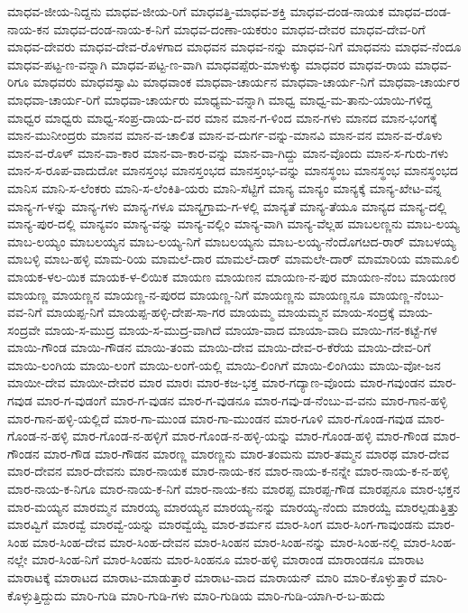 ಮಾಧವ-ಜೀಯ-ನಿದ್ದನು
ಮಾಧವ-ಜೀಯ-ರಿಗೆ
ಮಾಧವತ್ತಿ-ಮಾಧವ-ಶಕ್ತಿ
ಮಾಧವ-ದಂಡ-ನಾಯಕ
ಮಾಧವ-ದಂಡ-ನಾಯ-ಕನ
ಮಾಧವ-ದಂಡ-ನಾಯ-ಕ-ನಿಗೆ
ಮಾಧವ-ದಂಣಾ-ಯಕರುಂ
ಮಾಧವ-ದೇವರ
ಮಾಧವ-ದೇವ-ರಿಗೆ
ಮಾಧವ-ದೇವರು
ಮಾಧವ-ದೇವ-ರೊಳಗಾದ
ಮಾಧವನ
ಮಾಧವ-ನನ್ನು
ಮಾಧವ-ನಿಗೆ
ಮಾಧವನು
ಮಾಧವ-ನೆಂದೂ
ಮಾಧವ-ಪಟ್ಟ-ಣ-ವನ್ನಾಗಿ
ಮಾಧವ-ಪಟ್ಟ-ಣ-ವಾಗಿ
ಮಾಧವಪ್ಪೆರು-ಮಾಳುಕ್ಕು
ಮಾಧವರ
ಮಾಧವ-ರಾಯ
ಮಾಧವ-ರಿಗೂ
ಮಾಧವರು
ಮಾಧವಸ್ವಾಮಿ
ಮಾಧವಾಂಕ
ಮಾಧವಾ-ಚಾರ್ಯನ
ಮಾಧವಾ-ಚಾರ್ಯ-ನಿಗೆ
ಮಾಧವಾ-ಚಾರ್ಯರ
ಮಾಧವಾ-ಚಾರ್ಯ-ರಿಗೆ
ಮಾಧವಾ-ಚಾರ್ಯರು
ಮಾಧ್ಯಮ-ವನ್ನಾಗಿ
ಮಾಧ್ವ
ಮಾಧ್ವ-ಮ-ತಾನು-ಯಾಯಿ-ಗಳಿದ್ದ
ಮಾಧ್ವರ
ಮಾಧ್ವರು
ಮಾಧ್ವ-ಸಂಪ್ರ-ದಾಯ-ದ-ವರ
ಮಾನ
ಮಾನ-ಗ-ಳಿಂದ
ಮಾನ-ಗಳು
ಮಾನದ
ಮಾನ-ಭಂಗಕ್ಕೆ
ಮಾನ-ಮುನೀಂದ್ರರು
ಮಾನವ
ಮಾನ-ವ-ಚಾಲಿತ
ಮಾನ-ವ-ದುರ್ಗ-ವನ್ನು-ಮಾನವಿ
ಮಾನ-ವನ
ಮಾನ-ವ-ರೊಳು
ಮಾನ-ವ-ರೊಳ್
ಮಾನ-ವಾ-ಕಾರ
ಮಾನ-ವಾ-ಕಾರ-ವನ್ನು
ಮಾನ-ವಾ-ಗಿದ್ದು
ಮಾನ-ವೊಂದು
ಮಾನ-ಸ-ಗುರು-ಗಳು
ಮಾನ-ಸ-ರೂಪ-ವಾದುದೋ
ಮಾನಸ್ತಂಭ
ಮಾನಸ್ತಂಭದ
ಮಾನಸ್ತಂಭ-ವನ್ನು
ಮಾನಸ್ಥಂಬ
ಮಾನಸ್ಥಂಭ
ಮಾನಸ್ಥಂಭದ
ಮಾನಿಸ
ಮಾನಿ-ಸ-ಲೆಂಕರು
ಮಾನಿ-ಸ-ಲೆಂಕಿತಿ-ಯರು
ಮಾನಿ-ಸೆಟ್ಟಿಗೆ
ಮಾನ್ಯ
ಮಾನ್ಯಂ
ಮಾನ್ಯಕ್ಕೆ
ಮಾನ್ಯ-ಖೇಟ-ವನ್ನ
ಮಾನ್ಯ-ಗ-ಳನ್ನು
ಮಾನ್ಯ-ಗಳು
ಮಾನ್ಯ-ಗಳೂ
ಮಾನ್ಯಗ್ರಾಮ-ಗ-ಳಲ್ಲಿ
ಮಾನ್ಯತೆ
ಮಾನ್ಯ-ತೆಯೂ
ಮಾನ್ಯದ
ಮಾನ್ಯ-ದಲ್ಲಿ
ಮಾನ್ಯ-ಪುರ-ದಲ್ಲಿ
ಮಾನ್ಯವಂ
ಮಾನ್ಯ-ವನ್ನು
ಮಾನ್ಯ-ವಲ್ಲಿಂ
ಮಾನ್ಯ-ವಾಗಿ
ಮಾನ್ಯ-ವೆಲ್ಲಹ
ಮಾಬಲಣ್ಣನು
ಮಾಬ-ಲಯ್ಯ
ಮಾಬ-ಲಯ್ಯಂ
ಮಾಬಲಯ್ಯನ
ಮಾಬ-ಲಯ್ಯ-ನಿಗೆ
ಮಾಬಲಯ್ಯನು
ಮಾಬ-ಲಯ್ಯ-ನೆಂದೊಗೞದ-ರಾರ್
ಮಾಬಳಯ್ಯ
ಮಾಬಳ್ಳಿ
ಮಾಬ-ಹಳ್ಳಿ
ಮಾಮ-ರಿಯ
ಮಾಮಲೆ-ದಾರ
ಮಾಮಲೆ-ದಾರ್
ಮಾಮಲೇ-ದಾರ್
ಮಾಮಾರಿಯ
ಮಾಮೂಲಿ
ಮಾಯಕ-ಳಲ-ಯಿಕ
ಮಾಯಕ-ಳ-ಲಿಯಿಕ
ಮಾಯಣ
ಮಾಯಣನ
ಮಾಯಣ-ನ-ಪುರ
ಮಾಯಣ-ನೆಂಬ
ಮಾಯಣರ
ಮಾಯಣ್ಣ
ಮಾಯಣ್ಣನ
ಮಾಯಣ್ಣ-ನ-ಪುರದ
ಮಾಯಣ್ಣ-ನಿಗೆ
ಮಾಯಣ್ಣನು
ಮಾಯಣ್ಣನೂ
ಮಾಯಣ್ಣ-ನೆಂಬು-ವವ-ನಿಗೆ
ಮಾಯಪ್ಪ-ನಿಗೆ
ಮಾಯಪ್ಪ-ಹಳ್ಳಿ-ದೇಪ-ಸಾ-ಗರ
ಮಾಯಮ್ಮ
ಮಾಯಮ್ಮನ
ಮಾಯ-ಸಂದ್ರಕ್ಕೆ
ಮಾಯ-ಸಂದ್ರವೇ
ಮಾಯ-ಸ-ಮುದ್ರ
ಮಾಯ-ಸ-ಮುದ್ರ-ವಾಗಿದೆ
ಮಾಯಾ-ವಾದ
ಮಾಯಾ-ವಾದಿ
ಮಾಯಿ-ಗನ-ಕಟ್ಟೆ-ಗಳ
ಮಾಯಿ-ಗೌಂಡ
ಮಾಯಿ-ಗೌಡನ
ಮಾಯಿ-ತಂಮ
ಮಾಯಿ-ದೇವ
ಮಾಯಿ-ದೇವ-ರ-ಕೆರೆಯ
ಮಾಯಿ-ದೇವ-ರಿಗೆ
ಮಾಯಿ-ಲಂಗಿಯ
ಮಾಯಿ-ಲಂಗೆ
ಮಾಯಿ-ಲಂಗೆ-ಯಲ್ಲಿ
ಮಾಯಿ-ಲಿಂಗಿಗೆ
ಮಾಯಿ-ಲಿಂಗಿಯು
ಮಾಯಿ-ವೋ-ಜನ
ಮಾಯೀ-ದೇವ
ಮಾಯೀ-ದೇವರ
ಮಾರ
ಮಾರಃ
ಮಾರ-ಕಜ-ಭಕ್ತ
ಮಾರ-ಗದ್ಯಾಣ-ವೊಂದು
ಮಾರ-ಗವುಂಡನ
ಮಾರ-ಗವುಡ
ಮಾರ-ಗ-ವುಡಂಗೆ
ಮಾರ-ಗ-ವುಡನ
ಮಾರ-ಗ-ವುಡನೂ
ಮಾರ-ಗವು-ಡ-ನೆಂಬು-ವ-ವನು
ಮಾರ-ಗಾನ-ಹಳ್ಳಿ
ಮಾರ-ಗಾನ-ಹಳ್ಳಿ-ಯಲ್ಲಿದೆ
ಮಾರ-ಗಾ-ಮುಂಡ
ಮಾರ-ಗಾ-ಮುಂಡನ
ಮಾರ-ಗೂಳಿ
ಮಾರ-ಗೊಂಡ-ಗವುಡ
ಮಾರ-ಗೊಂಡ-ನ-ಹಳ್ಳಿ
ಮಾರ-ಗೊಂಡ-ನ-ಹಳ್ಳಿಗೆ
ಮಾರ-ಗೊಂಡ-ನ-ಹಳ್ಳಿ-ಯನ್ನು
ಮಾರ-ಗೊಂಡ-ಹಳ್ಳಿ
ಮಾರ-ಗೌಂಡ
ಮಾರ-ಗೌಂಡನ
ಮಾರ-ಗೌಡ
ಮಾರ-ಗೌಡನ
ಮಾರಣ್ಣ
ಮಾರಣ್ಣನು
ಮಾರ-ತಂಮನು
ಮಾರ-ತಮ್ಮನ
ಮಾರಥ
ಮಾರ-ದೇವ
ಮಾರ-ದೇವನ
ಮಾರ-ದೇವನು
ಮಾರ-ನಾಯಕ
ಮಾರ-ನಾಯ-ಕನ
ಮಾರ-ನಾಯ-ಕ-ನನ್ನೇ
ಮಾರ-ನಾಯ-ಕ-ನ-ಹಳ್ಳಿ
ಮಾರ-ನಾಯ-ಕ-ನಿಗೂ
ಮಾರ-ನಾಯ-ಕ-ನಿಗೆ
ಮಾರ-ನಾಯ-ಕನು
ಮಾರಪ್ಪ
ಮಾರಪ್ಪ-ಗೌಡ
ಮಾರಪ್ಪನೂ
ಮಾರ-ಭಕ್ತನ
ಮಾರ-ಮಯ್ಯನ
ಮಾರಮ್ಮನ
ಮಾರಯ್ಯ
ಮಾರಯ್ಯನ
ಮಾರಯ್ಯ-ನನ್ನು
ಮಾರಯ್ಯ-ನೆಂದು
ಮಾರಯ್ವೆ
ಮಾರಲ್ಪಡುತ್ತಿತ್ತು
ಮಾರವ್ವಿಗೆ
ಮಾರವ್ವೆ
ಮಾರವ್ವೆ-ಯನ್ನು
ಮಾರವ್ವೆಯ್ವೆ
ಮಾರ-ಶರ್ಮನ
ಮಾರ-ಸಿಂಗ
ಮಾರ-ಸಿಂಗ-ಗಾವುಂಡನು
ಮಾರ-ಸಿಂಹ
ಮಾರ-ಸಿಂಹ-ದೇವ
ಮಾರ-ಸಿಂಹ-ದೇವನ
ಮಾರ-ಸಿಂಹನ
ಮಾರ-ಸಿಂಹ-ನನ್ನು
ಮಾರ-ಸಿಂಹ-ನಲ್ಲಿ
ಮಾರ-ಸಿಂಹ-ನಲ್ಲೇ
ಮಾರ-ಸಿಂಹ-ನಿಗೆ
ಮಾರ-ಸಿಂಹನು
ಮಾರ-ಸಿಂಹನೂ
ಮಾರ-ಹಳ್ಳಿ
ಮಾರಾಂಡ
ಮಾರಾಂಡನೂ
ಮಾರಾಟ
ಮಾರಾಟಕ್ಕೆ
ಮಾರಾಟದ
ಮಾರಾಟ-ಮಾಡುತ್ತಾರೆ
ಮಾರಾಟ-ವಾದ
ಮಾರಾಯನ್
ಮಾರಿ
ಮಾರಿ-ಕೊಳ್ಳುತ್ತಾರೆ
ಮಾರಿ-ಕೊಳ್ಳುತ್ತಿದ್ದುದು
ಮಾರಿ-ಗುಡಿ
ಮಾರಿ-ಗುಡಿ-ಗಳು
ಮಾರಿ-ಗುಡಿಯ
ಮಾರಿ-ಗುಡಿ-ಯಾಗಿ-ರ-ಬ-ಹುದು
